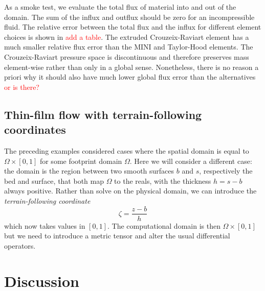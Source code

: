 \documentclass{article}
\theoremstyle{definition}
\theoremstyle{plain}
\begin{document}
As a smoke test, we evaluate the total flux of material into and out of the domain.
The sum of the influx and outflux should be zero for an incompressible fluid.
The relative error between the total flux and the influx for different element choices is shown in \textcolor{red}{add a table}.
The extruded Crouzeix-Raviart element has a much smaller relative flux error than the MINI and Taylor-Hood elements.
The Crouzeix-Raviart pressure space is discontinuous and therefore preserves mass element-wise rather than only in a global sense.
Nonetheless, there is no reason a priori why it should also have much lower global flux error than the alternatives \textcolor{red}{or is there?}

\subsection{Thin-film flow with terrain-following coordinates}

The preceding examples considered cases where the spatial domain is equal to $\Omega \times [0, 1]$ for some footprint domain $\Omega$.
Here we will consider a different case: the domain is the region between two smooth surfaces $b$ and $s$, respectively the bed and surface, that both map $\Omega$ to the reals, with the thickness $h = s - b$ always positive.
Rather than solve on the physical domain, we can introduce the \emph{terrain-following coordinate}
\begin{equation}
    \zeta = \frac{z - b}{h}
\end{equation}
which now takes values in $[0, 1]$.
The computational domain is then $\Omega \times [0, 1]$ but we need to introduce a metric tensor and alter the usual differential operators.



\section{Discussion}

\pagebreak



\end{document}
